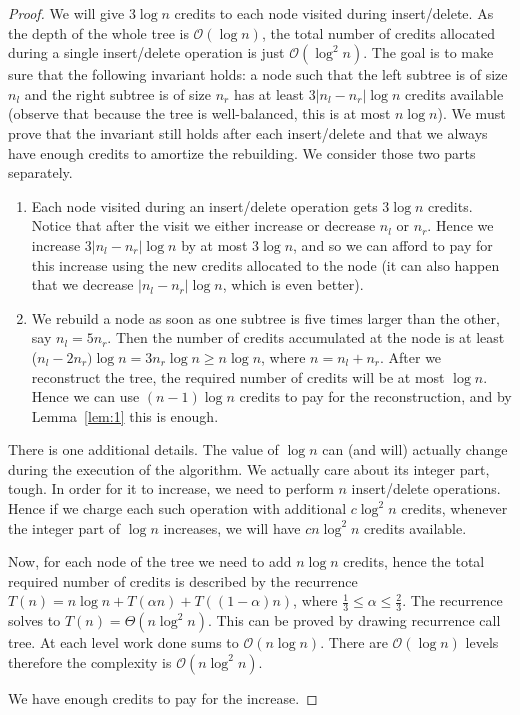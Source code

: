 \documentclass[10pt,a4paper]{article}
\newcommand{\Oh}{\mathcal{O}}
\begin{document}
\begin{proof}

We will give $3\log n$ credits to each node visited during insert/delete. As the depth of the whole tree is $\Oh(\log n)$, the total number of credits allocated during a single insert/delete operation is just $\Oh(\log^{2}n)$. The goal is to make sure that the following invariant holds: a node such that the left subtree is of size $n_{l}$ and the right subtree is of size $n_{r}$ has at least $3|n_{l}-n_{r}|\log n$ credits available (observe that because the tree is well-balanced, this is at most $n\log n$). We must prove that the invariant still holds after each insert/delete and that we always have enough credits to amortize the rebuilding. We consider those two parts separately.

\begin{enumerate}

\item Each node visited during an insert/delete operation gets $3\log n$ credits. Notice that after the visit we either increase or decrease $n_{l}$ or $n_{r}$. Hence we increase $3|n_{l}-n_{r}|\log n$ by at most $3\log n$, and so we can afford to pay for this increase using the new credits allocated to the node (it can also happen that we decrease $|n_{l}-n_{r}|\log n$, which is even better).

\item We rebuild a node as soon as one subtree is five times larger than the other, say $n_{l} = 5n_{r}$. Then the number of credits accumulated at the node is at least ($n_{l}-2n_{r}
)\log n = 3n_{r}\log n \geq n\log n$, where $n=n_{l}+n_{r}$. After we reconstruct the tree, the required number of credits will be at most $\log n$. Hence we can use $(n-1)\log n$ credits to pay for the reconstruction, and by Lemma~\ref{lem:1} this is enough.

\end{enumerate}

There is one additional details. The value of $\log n$ can (and will) actually change during the execution of the algorithm. We actually care about its integer part, tough. In order for it to increase, we need to perform $n$ insert/delete operations. Hence if we charge each such operation with additional $c\log^{2} n$ credits, whenever the integer part of $\log n$ increases, we will have $cn\log^{2} n$ credits available. 

Now, for each node of the tree we need to add $n\log n$ credits, hence the total required number of credits is described by the recurrence $T(n)=n\log n+T(\alpha n)+T((1-\alpha)n)$, where $\frac{1}{3}\leq \alpha \leq \frac{2}{3}$. The recurrence solves to $T(n)=\Theta(n\log^{2}n)$. This can be proved by drawing recurrence call tree. At each level work done sums to $\Oh(n \log n)$. There are $\Oh(\log n)$ levels therefore the complexity is $\Oh(n \log^2 n)$.

We have enough credits to pay for the increase.
\end{proof}
\end{document}
